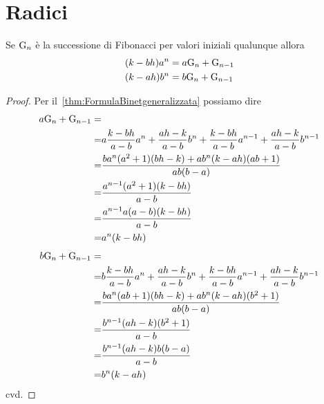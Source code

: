 \section{Radici}
\begin{thm}[Potenze di $a$ e $b$]
	\label{thm:FibRimuovipotab
	}
	Se $\mathrm{G}_{n}$  è la successione di Fibonacci per valori iniziali qualunque 
	allora 
	\begin{align*}
		(k-bh)a^n={}&a\mathrm{G}_{n}+\mathrm{G}_{n-1}\\
		(k-ah)b^n={}&b\mathrm{G}_{n}+\mathrm{G}_{n-1}\\
	\end{align*}
\end{thm}
\begin{proof}
	Per il~\vref{thm:FormulaBinetgeneralizzata} possiamo dire
	\begin{align*}
		a\mathrm{G}_{n}+\mathrm{G}_{n-1}=&\\
	=&a\dfrac{k-bh}{a-b}a^{n}+\dfrac{ah-k}{a-b}b^{n}+
	\dfrac{k-bh}{a-b}a^{n-1}+\dfrac{ah-k}{a-b}b^{n-1}\\
	=&\dfrac{ba^n(a^2+1)(bh-k)+ab^n(k-ah)(ab+1)}{ab(b-a)}\\
	=&\dfrac{a^{n-1}(a^2+1)(k-bh)}{a-b}\\
	=&\dfrac{a^{n-1}a(a-b)(k-bh)}{a-b}\\
	=&a^{n}(k-bh)\\
	\end{align*}
\begin{align*}
	b\mathrm{G}_{n}+\mathrm{G}_{n-1}=&\\
	=&b\dfrac{k-bh}{a-b}a^{n}+\dfrac{ah-k}{a-b}b^{n}+
	\dfrac{k-bh}{a-b}a^{n-1}+\dfrac{ah-k}{a-b}b^{n-1}\\
	=&\dfrac{ba^n(ab+1)(bh-k)+ab^n(k-ah)(b^2+1)}{ab(b-a)}\\
	=&\dfrac{b^{n-1}(ah-k)(b^2+1)}{a-b}\\
	=&\dfrac{b^{n-1}(ah-k)b(b-a)}{a-b}\\
	=&b^{n}(k-ah)\\
\end{align*}
cvd.
\end{proof}
